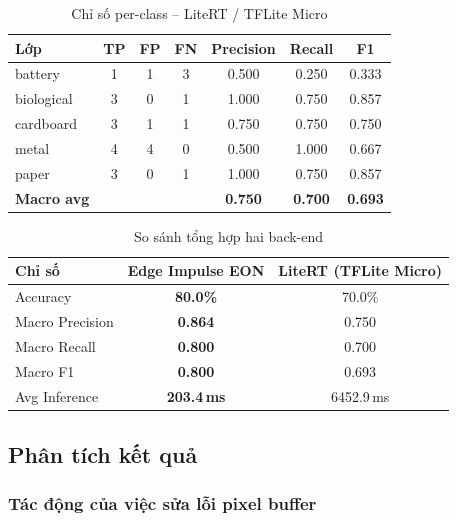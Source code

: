 \documentclass[12pt,a4paper]{article}
\begin{document}
\begin{table}[H]
\centering
\caption{Chỉ số per-class -- LiteRT / TFLite Micro}
\begin{tabular}{@{}lcccccc@{}}
\toprule
\textbf{Lớp} & \textbf{TP} & \textbf{FP} & \textbf{FN} & \textbf{Precision} & \textbf{Recall} & \textbf{F1} \\
\midrule
battery    & 1 & 1 & 3 & 0.500 & 0.250 & 0.333 \\
biological & 3 & 0 & 1 & 1.000 & 0.750 & 0.857 \\
cardboard  & 3 & 1 & 1 & 0.750 & 0.750 & 0.750 \\
metal      & 4 & 4 & 0 & 0.500 & 1.000 & 0.667 \\
paper      & 3 & 0 & 1 & 1.000 & 0.750 & 0.857 \\
\midrule
\textbf{Macro avg} & & & & \textbf{0.750} & \textbf{0.700} & \textbf{0.693} \\
\bottomrule
\end{tabular}
\end{table}

\begin{table}[H]
\centering
\caption{So sánh tổng hợp hai back-end}
\begin{tabular}{@{}lcc@{}}
\toprule
\textbf{Chỉ số} & \textbf{Edge Impulse EON} & \textbf{LiteRT (TFLite Micro)} \\
\midrule
Accuracy         & \textbf{80.0\%} & 70.0\% \\
Macro Precision  & \textbf{0.864}  & 0.750 \\
Macro Recall     & \textbf{0.800}  & 0.700 \\
Macro F1         & \textbf{0.800}  & 0.693 \\
Avg Inference    & \textbf{203.4\,ms} & 6452.9\,ms \\
\bottomrule
\end{tabular}
\end{table}

\subsection{Phân tích kết quả}

\subsubsection*{Tác động của việc sửa lỗi pixel buffer}
\end{document}
